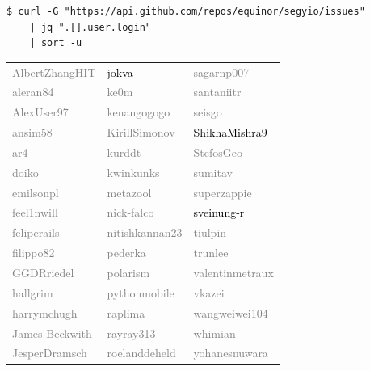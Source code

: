 \documentclass[pdf]{beamer}
\begin{document}
\begin{frame}[fragile]
    \begin{Verbatim}[fontsize=\footnotesize]
$ curl -G "https://api.github.com/repos/equinor/segyio/issues"
    | jq ".[].user.login"
    | sort -u
    \end{Verbatim}

    \newcommand{\fade}[1]{\textcolor<2>{gray}{#1}}
    \newcommand{\stay}[1]{\textcolor<2>{black}{#1}}

    \begin{tabular}{l l l}
        \fade{AlbertZhangHIT} & \stay{jokva}          & \fade{sagarnp007}      \\
        \fade{aleran84}       & \fade{ke0m}           & \fade{santaniitr}      \\
        \fade{AlexUser97}     & \fade{kenangogogo}    & \fade{seisgo}          \\
        \fade{ansim58}        & \fade{KirillSimonov}  & \stay{ShikhaMishra9}   \\
        \fade{ar4}            & \fade{kurddt}         & \fade{StefosGeo}       \\
        \fade{doiko}          & \fade{kwinkunks}      & \fade{sumitav}         \\
        \fade{emilsonpl}      & \fade{metazool}       & \fade{superzappie}     \\
        \fade{feel1nwill}     & \fade{nick-falco}     & \stay{sveinung-r}      \\
        \fade{feliperails}    & \fade{nitishkannan23} & \fade{tiulpin}         \\
        \fade{filippo82}      & \fade{pederka}        & \fade{trunlee}         \\
        \fade{GGDRriedel}     & \fade{polarism}       & \fade{valentinmetraux} \\
        \fade{hallgrim}       & \fade{pythonmobile}   & \fade{vkazei}          \\
        \fade{harrymchugh}    & \fade{raplima}        & \fade{wangweiwei104}   \\
        \fade{James-Beckwith} & \fade{rayray313}      & \fade{whimian}         \\
        \fade{JesperDramsch}  & \fade{roelanddeheld}  & \fade{yohanesnuwara}   \\
    \end{tabular}

\end{frame}
\end{document}
